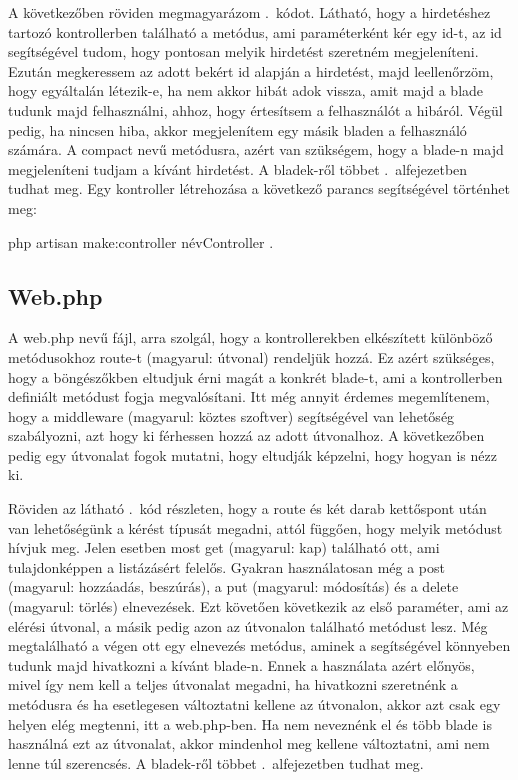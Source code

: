 \documentclass[]{thesis-ekf}
\theoremstyle{definition}
\theoremstyle{remark}
\begin{document}
			A következőben röviden megmagyarázom .~kódot. Látható, hogy a hirdetéshez tartozó kontrollerben található a metódus, ami paraméterként kér egy id-t, az id segítségével tudom, hogy pontosan melyik hirdetést szeretném megjeleníteni. Ezután megkeressem az adott bekért id alapján a hirdetést, majd leellenőrzöm, hogy egyáltalán létezik-e, ha nem akkor hibát adok vissza, amit majd a blade tudunk majd felhasználni, ahhoz, hogy értesítsem a felhasználót a hibáról. Végül pedig, ha nincsen hiba, akkor megjelenítem egy másik bladen a felhasználó számára. A compact nevű metódusra, azért van szükségem, hogy a blade-n majd megjeleníteni tudjam a kívánt hirdetést. A bladek-ről többet .~alfejezetben tudhat meg.  Egy kontroller létrehozása a következő parancs segítségével történhet meg:
		\begin{center} 
			php artisan make:controller névController .
		\end{center}
		  
	\subsection{Web.php}
		A web.php nevű fájl, arra szolgál, hogy a kontrollerekben elkészített különböző metódusokhoz route-t (magyarul: útvonal) rendeljük hozzá. Ez azért szükséges, hogy a böngészőkben eltudjuk érni magát a konkrét blade-t, ami a kontrollerben definiált metódust fogja megvalósítani. Itt még annyit érdemes megemlítenem, hogy a middleware (magyarul: köztes szoftver) segítségével van lehetőség szabályozni, azt hogy ki férhessen hozzá az adott útvonalhoz. A következőben pedig egy útvonalat fogok mutatni, hogy eltudják képzelni, hogy hogyan is nézz ki.
	
		
	
		Röviden az látható .~kód részleten, hogy a route és két darab kettőspont után van lehetőségünk a kérést típusát megadni, attól függően, hogy melyik metódust hívjuk meg. Jelen esetben most get (magyarul: kap) található ott, ami tulajdonképpen a listázásért felelős. Gyakran használatosan még a post (magyarul: hozzáadás, beszúrás), a put (magyarul: módosítás) és a delete (magyarul: törlés) elnevezések. Ezt követően következik az első paraméter, ami az elérési útvonal, a másik pedig azon az útvonalon található metódust lesz. Még megtalálható a végen ott egy elnevezés metódus, aminek a segítségével könnyeben tudunk majd hivatkozni a kívánt blade-n. Ennek a használata azért előnyös, mivel így nem kell a teljes útvonalat megadni, ha hivatkozni szeretnénk a metódusra és ha esetlegesen változtatni kellene az útvonalon, akkor azt csak egy helyen elég megtenni, itt a web.php-ben. Ha nem neveznénk el és több blade is használná ezt az útvonalat, akkor mindenhol meg kellene változtatni, ami nem lenne túl szerencsés. A bladek-ről többet .~alfejezetben tudhat meg.
		
\end{document}
